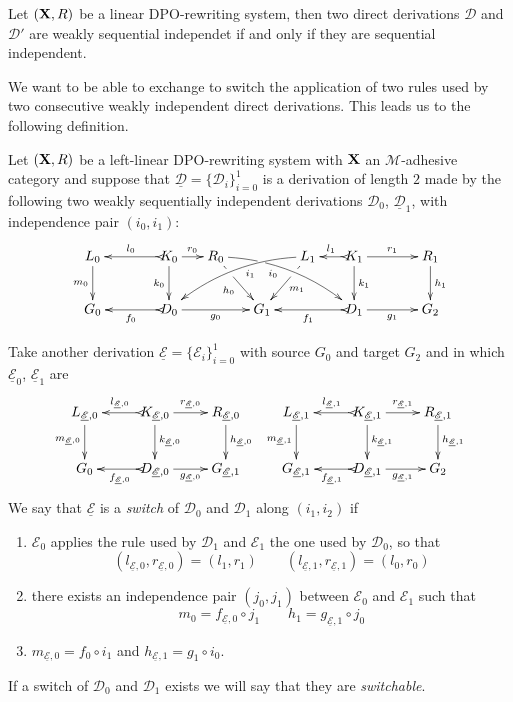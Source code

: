\documentclass[a4paper,UKenglish,cleveref,pdftex, thm-restate,numberwithinsect]{lipics}
\def\R{\mathsf{R}}
\def\X{\textbf {\textup{X}}}
\newcommand{\dder}[1]{\mathscr{#1}}
\newcommand{\der}[1]{\underline{\dder{#1}}}
\begin{document}
	\begin{proposition}\label{rem:weak}
	Let $(\X, \R)$ be a linear DPO-rewriting system, then two direct derivations $\dder{D}$ and $\dder{D}'$ are weakly sequential independet if and only if they are sequential independent. 
\end{proposition}


We want to be able to exchange to switch the application of two rules used by two consecutive weakly independent direct derivations. This leads us to the following definition.

\begin{definition}[Switch]\label{def:switc}
  \label{de:switch}
 Let $(\X, \R)$ be a left-linear DPO-rewriting system with $\X$ an $\mathcal{M}$-adhesive category and suppose that $\der{D}=\{\dder{D}_i\}_{i=0}^1$  is a derivation of length $2$ made by the following two weakly sequentially independent derivations $\dder{D}_0$, $\der{D}_1$, with independence pair $(i_0, i_1)$:
 	\[\xymatrix@C=15pt{L_0 \ar[d]_{m_0}&& K_0 \ar[d]_{k_0}\ar@{>->}[ll]_{l_0} \ar[r]^{r_0} & R_0 \ar@/^.35cm/[drrr]|(.3)\hole_(.4){i_0} \ar[dr]|(.3)\hole_{h_0} && L_1 \ar@/_.35cm/[dlll]^(.4){i_1} \ar[dl]|(.3)\hole^{m_1}& K_1 \ar[d]^{k_1}\ar@{>->}[l]_{l_1} \ar[rr]^{r_1} && R_1 \ar[d]^{h_1}\\G_0 && \ar@{>->}[ll]^{f_0} D_0 \ar[rr]_{g_0}&& G_1  && \ar@{>->}[ll]^{f_1} D_1 \ar[rr]_{g_1}&& G_2}\]
 	
 	Take another derivation $\der{E}=\{\dder{E}_i\}_{i=0}^1$ with source $G_0$ and target $G_2$ and in which $\der{E}_0$, $\der{E}_1$ are
\[\xymatrix{L_{\der{E},0} \ar[d]_{m_{\der{E},0}}& K_{\der{E},0} \ar[d]^{k_{\der{E},0}}\ar@{>->}[l]_{l_{\der{E},0}} \ar[r]^{r_{\der{E},0}} & R_{\der{E},0} \ar[d]^{h_{\der{E},0}} & L_{\der{E},1} \ar[d]_{m_{\der{E},1}}& K_{\der{E},1} \ar[d]^{k_{\der{E},1}}\ar@{>->}[l]_{l_{\der{E},1}} \ar[r]^{r_{\der{E},1}} & R_{\der{E},1} \ar[d]^{h_{\der{E},1}}\\G_{0} & \ar@{>->}[l]^{f_{\der{E},0}} D_{\der{E},0} \ar[r]_{g_{\der{E},0}}& G_{\der{E},1} & G_{\der{E},1} & \ar@{>->}[l]^{f_{\der{E},1}} D_{\der{E},1} \ar[r]_{g_{\der{E},1}}& G_{2}}\]
 	We say that $\der{E}$ is a
 	 	 \emph{switch} of $\dder{D}_0$ and $\dder{D}_1$ along $(i_1, i_2)$ if
 	\begin{enumerate}
 		\item $\dder{E}_0$ applies the rule used by $\dder{D}_1$ and $\dder{E}_1$ the one used by $\dder{D}_0$, so that
 		\[(l_{\der{E},0}, r_{\der{E},0})=(l_1,r_1)  \qquad (l_{\der{E},1}, r_{\der{E},1})=(l_0,r_0)\]
 		\item there exists an independence pair $(j_0, j_1)$ between $\dder{E}_0$ and $\dder{E}_1$ such that
 		\[ m_0=f_{\der{E},0} \circ j_1 \qquad h_1=g_{\der{E},1} \circ j_0\]
 		\item $m_{\der{E},0}= f_0\circ i_1$ and $h_{\der{E},1}= g_{1}\circ i_0$.
 	\end{enumerate}

If a switch of $\dder{D}_0$ and $\dder{D}_1$ exists we will say that they are \emph{switchable}.
\end{definition}
\end{document}
